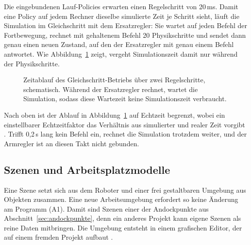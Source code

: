Die eingebundenen Lauf-Policies erwarten einen Regelschritt von 20\,ms.
Damit eine Policy auf jedem Rechner dieselbe simulierte Zeit je Schritt sieht, läuft die Simulation im Gleichschritt mit dem Ersatzregler: Sie wartet auf jeden Befehl der Fortbewegung, rechnet mit gehaltenem Befehl 20 Physikschritte und sendet dann genau einen neuen Zustand, auf den der Ersatzregler mit genau einem Befehl antwortet.
Wie Abbildung~\ref{fig:lockstep} zeigt, vergeht Simulationszeit damit nur während der Physikschritte.

\begin{figure}[htbp]
  \centering
  
  \caption[Zeitablauf des Gleichschritt-Betriebs]{Zeitablauf des Gleichschritt-Betriebs über zwei Regelschritte, schematisch. Während der Ersatzregler rechnet, wartet die Simulation, sodass diese Wartezeit keine Simulationszeit verbraucht.}
  \label{fig:lockstep}
\end{figure}

Nach oben ist der Ablauf in Abbildung~\ref{fig:lockstep} auf Echtzeit begrenzt, wobei ein einstellbarer Echtzeitfaktor das Verhältnis aus simulierter und realer Zeit vorgibt \cite{Pitonakova2018}.
Trifft 0,2\,s lang kein Befehl ein, rechnet die Simulation trotzdem weiter, und der Armregler ist an diesen Takt nicht gebunden.

\subsection{Szenen und Arbeitsplatzmodelle}
\label{sec:szenen}
Eine Szene setzt sich aus dem Roboter und einer frei gestaltbaren Umgebung aus Objekten zusammen.
Eine neue Arbeitsumgebung erfordert so keine Änderung am Programm (A1).
Damit sind Szenen einer der Andockpunkte aus Abschnitt~\ref{sec:andockpunkte}, denn ein anderes Projekt kann eigene Szenen als reine Daten mitbringen.
Die Umgebung entsteht in einem grafischen Editor, der auf einem fremden Projekt aufbaut .

